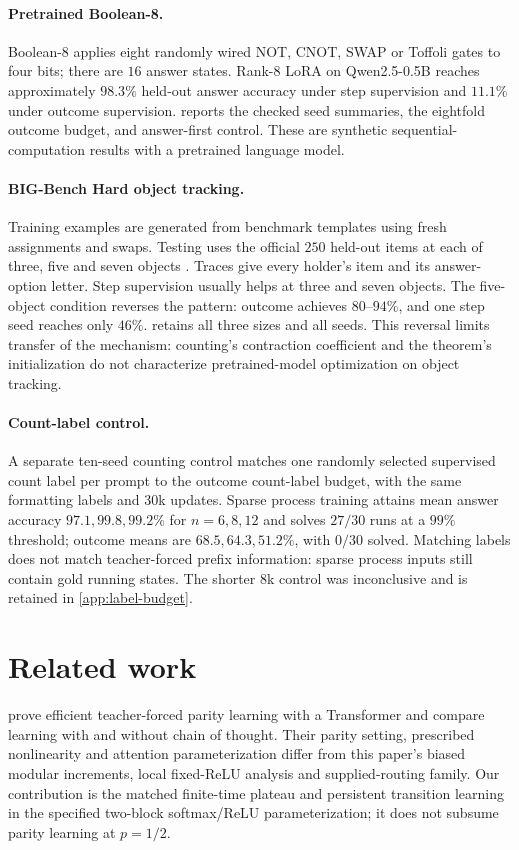 \paragraph{Pretrained Boolean-8.}
Boolean-8 applies eight randomly wired NOT, CNOT, SWAP or Toffoli gates to four bits; there are $16$ answer states. Rank-$8$ LoRA on Qwen2.5-0.5B \citep{qwen2025qwen25,hu2022lora} reaches approximately $98.3\%$ held-out answer accuracy under step supervision and $11.1\%$ under outcome supervision.  reports the checked seed summaries, the eightfold outcome budget, and answer-first control. These are synthetic sequential-computation results with a pretrained language model.


\paragraph{BIG-Bench Hard object tracking.}
Training examples are generated from benchmark templates using fresh assignments and swaps. Testing uses the official $250$ held-out items at each of three, five and seven objects \citep{suzgun2022challenging}. Traces give every holder's item and its answer-option letter. Step supervision usually helps at three and seven objects. The five-object condition reverses the pattern: outcome achieves $80$--$94\%$, and one step seed reaches only $46\%$.  retains all three sizes and all seeds. This reversal limits transfer of the mechanism: counting's contraction coefficient and the theorem's initialization do not characterize pretrained-model optimization on object tracking.

\paragraph{Count-label control.}
A separate ten-seed counting control matches one randomly selected supervised count label per prompt to the outcome count-label budget, with the same formatting labels and $30$k updates. Sparse process training attains mean answer accuracy $97.1,99.8,99.2\%$ for $n=6,8,12$ and solves $27/30$ runs at a $99\%$ threshold; outcome means are $68.5,64.3,51.2\%$, with $0/30$ solved. Matching labels does not match teacher-forced prefix information: sparse process inputs still contain gold running states. The shorter $8$k control was inconclusive and is retained in \cref{app:label-budget}.

\section{Related work}\label{sec:related}
\citet{kim2024parity} prove efficient teacher-forced parity learning with a Transformer and compare learning with and without chain of thought. Their parity setting, prescribed nonlinearity and attention parameterization differ from this paper's biased modular increments, local fixed-ReLU analysis and supplied-routing family. Our contribution is the matched finite-time plateau and persistent transition learning in the specified two-block softmax/ReLU parameterization; it does not subsume parity learning at $p=1/2$.

